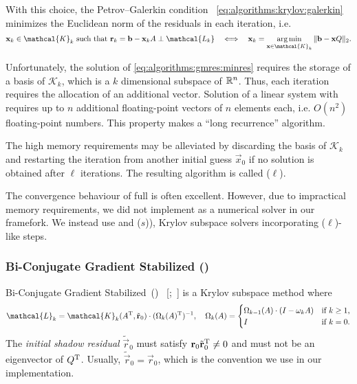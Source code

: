 With this choice, the Petrov--Galerkin condition~%
\eqref{eq:algorithms:krylov:galerkin} minimizes the Euclidean norm of
the residuals in each iteration, i.e.
\begin{equation}
  \label{eq:algorithms:gmres:minres}
  \vec{x}_k \in \mathcal{K}_k \text{ such that } \vec{r}_k = \vec{b} - \vec{x}_k A \perp
  \mathcal{L_k} \quad\Longleftrightarrow\quad \vec{x}_k = \argmin_{\vec{x} \in
    \mathcal{K}_k} \| \vec{b} - \vec{x} Q \|_2 \text.
\end{equation}

Unfortunately, the solution of \cref{eq:algorithms:gmres:minres}
requires the storage of a basis of $\mathcal{K}_k$, which is a $k$
dimensional subspace of $\mathbb{R}^n$. Thus, each iteration requires the
allocation of an additional vector. Solution of a linear system with
 requires up to $n$ additional floating-point vectors of
$n$ elements each, i.e. $O(n^2)$ floating-point numbers. This property
makes  a ``long recurrence'' algorithm.

The high memory requirements may be alleviated by discarding the basis
of $\mathcal{K}_k$ and restarting the iteration from another initial
guess $\vec{x}_0$ if no solution is obtained after $\ell$
iterations. The resulting algorithm is called ($\ell$).

The convergence behaviour of full  is often
excellent. However, due to impractical memory requirements, we did not
implement  as a numerical solver in our framefork.  We
instead use  and
($s$)), Krylov subspace solvers
incorporating ($\ell$)-like steps.

\subsubsection{Bi-Conjugate Gradient Stabilized ()}
\label{ssec:algorithms:bicgstab}

Bi-Conjugate Gradient Stabilized~()%
~\mkbibbrackets{;~}
is a Krylov subspace method where~\citep{simoncini2010interpreting}
\begin{equation}
  \label{eq:algorithms:bicgstab:stabpoly}
  \mathcal{L}_k = \mathcal{K}_k(A^\T, \tilde{\vec{r}}_0) \cdot
  (\Omega_k(A)^\T)^{-1}, \quad
  \Omega_k(A) = \begin{cases}
    \Omega_{k - 1}(A) \cdot (I - \omega_k A) & \text{if $k \ge 1$,} \\
    I & \text{if $k = 0$.}
  \end{cases}
\end{equation}
The \emph{initial shadow residual} $\tilde{\vec{r}}_0$ must satisfy
$\bm{\mathrm{r}}_0 \tilde{\bm{\mathrm{r}}}_0^{\mathrm{T}} \ne 0$ and must not be an eigenvector
of $Q^{\mathrm{T}}$. Usually, $\tilde{\vec{r}}_0 = \vec{r}_0$, which is the
convention we use in our implementation.

